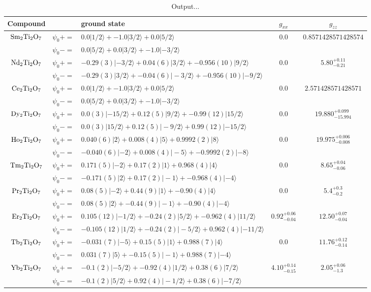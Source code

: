 \begin{table*}
\caption{Output...}
\begin{ruledtabular}
\begin{tabular}{c|rl|c|c}
Compound & & ground state & $g_{xx}$ & $g_{zz}$ \tabularnewline
 \hline 
$\rm Sm_2Ti_2O_7$ &$ \psi_0+ =$ &$ 0.0|1/2 \rangle + -1.0|3/2 \rangle + 0.0|5/2 \rangle  $&$ 0.0  $&$ 0.8571428571428574  $ \tabularnewline
 & $   \psi_0- =$ &$ 0.0|5/2 \rangle + 0.0|3/2 \rangle + -1.0|-3/2 \rangle $ & & \tabularnewline
$\rm Nd_2Ti_2O_7$ &$ \psi_0+ =$ &$ -0.29(3)|-3/2 \rangle + 0.04(6)|3/2 \rangle + -0.956(10)|9/2 \rangle  $&$ 0.0  $&$ 5.80^{+0.11}_{-0.21}  $ \tabularnewline
 & $   \psi_0- =$ &$ -0.29(3)|3/2 \rangle + -0.04(6)|-3/2 \rangle + -0.956(10)|-9/2 \rangle $ & & \tabularnewline
$\rm Ce_2Ti_2O_7$ &$ \psi_0+ =$ &$ 0.0|1/2 \rangle + -1.0|3/2 \rangle + 0.0|5/2 \rangle  $&$ 0.0  $&$ 2.571428571428571  $ \tabularnewline
 & $   \psi_0- =$ &$ 0.0|5/2 \rangle + 0.0|3/2 \rangle + -1.0|-3/2 \rangle $ & & \tabularnewline
$\rm Dy_2Ti_2O_7$ &$ \psi_0+ =$ &$ 0.0(3)|-15/2 \rangle + 0.12(5)|9/2 \rangle + -0.99(12)|15/2 \rangle  $&$ 0.0  $&$ 19.880^{+0.099}_{-15.994}  $ \tabularnewline
 & $   \psi_0- =$ &$ 0.0(3)|15/2 \rangle + 0.12(5)|-9/2 \rangle + 0.99(12)|-15/2 \rangle $ & & \tabularnewline
$\rm Ho_2Ti_2O_7$ &$ \psi_0+ =$ &$ 0.040(6)|2 \rangle + 0.008(4)|5 \rangle + 0.9992(2)|8 \rangle  $&$ 0.0  $&$ 19.975^{+0.006}_{-0.008}  $ \tabularnewline
 & $   \psi_0- =$ &$ -0.040(6)|-2 \rangle + 0.008(4)|-5 \rangle + -0.9992(2)|-8 \rangle $ & & \tabularnewline
$\rm Tm_2Ti_2O_7$ &$ \psi_0+ =$ &$ 0.171(5)|-2 \rangle + 0.17(2)|1 \rangle + 0.968(4)|4 \rangle  $&$ 0.0  $&$ 8.65^{+0.04}_{-0.06}  $ \tabularnewline
 & $   \psi_0- =$ &$ -0.171(5)|2 \rangle + 0.17(2)|-1 \rangle + -0.968(4)|-4 \rangle $ & & \tabularnewline
$\rm Pr_2Ti_2O_7$ &$ \psi_0+ =$ &$ 0.08(5)|-2 \rangle + 0.44(9)|1 \rangle + -0.90(4)|4 \rangle  $&$ 0.0  $&$ 5.4^{+0.3}_{-0.2}  $ \tabularnewline
 & $   \psi_0- =$ &$ 0.08(5)|2 \rangle + -0.44(9)|-1 \rangle + -0.90(4)|-4 \rangle $ & & \tabularnewline
$\rm Er_2Ti_2O_7$ &$ \psi_0+ =$ &$ 0.105(12)|-1/2 \rangle + -0.24(2)|5/2 \rangle + -0.962(4)|11/2 \rangle  $&$ 0.92^{+0.06}_{-0.04}  $&$ 12.50^{+0.07}_{-0.04}  $ \tabularnewline
 & $   \psi_0- =$ &$ -0.105(12)|1/2 \rangle + -0.24(2)|-5/2 \rangle + 0.962(4)|-11/2 \rangle $ & & \tabularnewline
$\rm Tb_2Ti_2O_7$ &$ \psi_0+ =$ &$ -0.031(7)|-5 \rangle + 0.15(5)|1 \rangle + 0.988(7)|4 \rangle  $&$ 0.0  $&$ 11.76^{+0.12}_{-0.14}  $ \tabularnewline
 & $   \psi_0- =$ &$ 0.031(7)|5 \rangle + -0.15(5)|-1 \rangle + 0.988(7)|-4 \rangle $ & & \tabularnewline
$\rm Yb_2Ti_2O_7$ &$ \psi_0+ =$ &$ -0.1(2)|-5/2 \rangle + -0.92(4)|1/2 \rangle + 0.38(6)|7/2 \rangle  $&$ 4.10^{+0.14}_{-0.15}  $&$ 2.05^{+0.06}_{-1.3}  $ \tabularnewline
 & $   \psi_0- =$ &$ -0.1(2)|5/2 \rangle + 0.92(4)|-1/2 \rangle + 0.38(6)|-7/2 \rangle $ & & \tabularnewline
\end{tabular}\end{ruledtabular}
\label{flo:Eigenvectors}
\end{table*}

